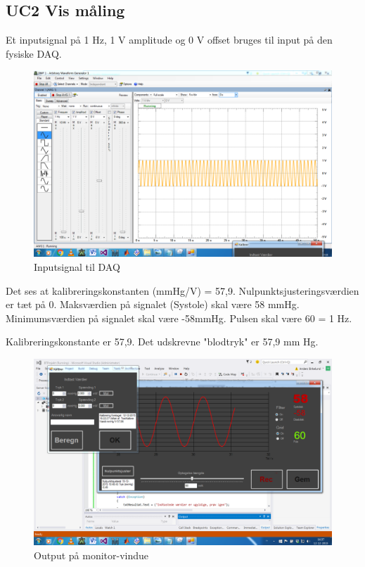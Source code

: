 \subsection{UC2 Vis måling}
Et inputsignal på 1 Hz, 1 V amplitude og 0 V offset bruges til input på den fysiske DAQ. 
\begin{figure}[H]
	\centering
	\includegraphics[width=1\textwidth]{Figurer/Test_Vis_1}
	\caption{Inputsignal til DAQ}
\end{figure}

Det ses at kalibreringskonstanten (mmHg/V) = 57,9.
Nulpunktsjusteringsværdien er tæt på 0.
Maksværdien på signalet (Systole) skal være 58 mmHg.
Minimumsværdien på signalet skal være -58mmHg. 
Pulsen skal være 60 = 1 Hz.

Kalibreringskonstante er 57,9. Det udskrevne "blodtryk" er 57,9 mm Hg.
\begin{figure}[H]
	\centering
	\includegraphics[width=1\textwidth]{Figurer/Test_Vis_2}
	\caption{Output på monitor-vindue}
\end{figure}




